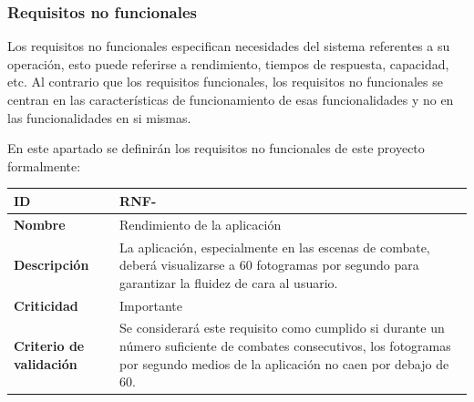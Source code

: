 \clearpage

\subsubsection{Requisitos no funcionales}

\setcounter{contador_requisitos_no_funcionales}{1}

Los requisitos no funcionales especifican necesidades del sistema referentes a su operación, esto puede referirse a rendimiento, tiempos de respuesta, capacidad, etc. Al contrario que los requisitos funcionales, los requisitos no funcionales se centran en las características de funcionamiento de esas funcionalidades y no en las funcionalidades en si mismas.

\bigskip 

En este apartado se definirán los requisitos no funcionales de este proyecto formalmente:

\begin{center}
	\begin{tabular}{ | p{4.7cm} | p{10cm} | } 
		\hline
		
		\textbf{ID} & RNF-\arabic{contador_requisitos_no_funcionales}
		{contador_requisitos_no_funcionales} \\
		
		\hline 
		\textbf{Nombre} &
		Rendimiento de la aplicación\\ 
		
		\hline
		\textbf{Descripción} & 
		La aplicación, especialmente en las escenas de combate, deberá visualizarse a 60 fotogramas por segundo para garantizar la fluidez de cara al usuario.\\
		
		\hline 
		\textbf{Criticidad} &
		Importante\\
		
		\hline 
		\textbf{Criterio de validación} & 
		Se considerará este requisito como cumplido si durante un número suficiente de combates consecutivos, los fotogramas por segundo medios de la aplicación no caen por debajo de 60.\\
		
		\hline
	\end{tabular}
\end{center}


